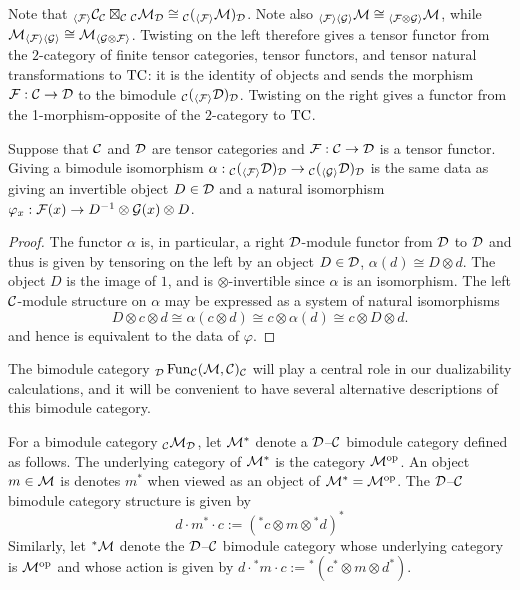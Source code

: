 \documentclass{amsart}
\begin{document}
Note that ${}_{\langle \mathcal F \rangle} \mathcal C_\mathcal C \boxtimes_{\mathcal C} {}_{\mathcal C} \mathcal M_\mathcal D \cong {}_{\mathcal C} ({}_{\langle \mathcal F \rangle} \mathcal M)_\mathcal D$.  Note also ${}_{\langle \mathcal F \rangle \langle \mathcal G \rangle} \mathcal M \cong {}_{\langle \mathcal F \otimes \mathcal G \rangle} \mathcal M$, while $\mathcal M_{\langle \mathcal F \rangle \langle \mathcal G \rangle} \cong  \mathcal M_{\langle \mathcal G \otimes \mathcal F \rangle}$.  Twisting on the left therefore gives a tensor functor from the $2$-category of finite tensor categories, tensor functors, and tensor natural transformations to $\mathrm{TC}$: it is the identity of objects and sends the morphism $\mathcal F: \mathcal C \rightarrow \mathcal D$ to the bimodule ${}_{\mathcal C} ({}_{\langle \mathcal F \rangle} \mathcal D)_{\mathcal D}$.  Twisting on the right gives a functor from the 1-morphism-opposite of the $2$-category to $\mathrm{TC}$.

\begin{lemma}
Suppose that $\mathcal C$ and $\mathcal D$ are tensor categories and $\mathcal F: \mathcal C \rightarrow \mathcal D$ is a tensor functor.
Giving a bimodule isomorphism $\alpha:{}_{\mathcal C} ({}_{\langle \mathcal F \rangle} \mathcal D)_\mathcal D \rightarrow {}_{\mathcal C} ({}_{\langle \mathcal G \rangle} \mathcal D)_\mathcal D$ is the same data as giving an invertible object $D \in \mathcal D$ and a natural isomorphism $\varphi_x: \mathcal F(x) \rightarrow D^{-1} \otimes \mathcal G(x) \otimes D$.
\end{lemma}
\begin{proof}
The functor $\alpha$ is, in particular, a right $\mathcal D$-module functor from $\mathcal D$ to $\mathcal D$ and thus is given by tensoring on the left by an object $D \in \mathcal D$, $\alpha(d) \cong D \otimes d$. The object $D$ is the image of $1$, and is $\otimes$-invertible since $\alpha$ is an isomorphism. The left $\mathcal C$-module structure on $\alpha$ may be expressed as a system of natural isomorphisms
\begin{equation*}
	D \otimes c \otimes d \cong \alpha (c \otimes d) \cong c \otimes \alpha(d) \cong c \otimes D \otimes d.
\end{equation*}
and hence is equivalent to the data of $\varphi$. 
\end{proof}

The bimodule category ${}_\mathcal D \operatorname{Fun}_\mathcal C(\mathcal M,\mathcal C)_\mathcal C$ will play a central role in our dualizability calculations, and it will be convenient to have several alternative descriptions of this bimodule category.

\begin{definition} \label{def:Dual_bimodule_notation}
For a bimodule category ${}_\mathcal C \mathcal M_\mathcal D$, let $\mathcal M^*$ denote a $\mathcal D$--$\mathcal C$ bimodule category defined as follows.  The underlying category of $\mathcal M^*$ is the category $\mathcal M^{\mathrm{op}}$. An object $m \in \mathcal M$ is denotes $m^*$ when viewed as an object of $\mathcal M^* = \mathcal M^{\mathrm{op}}$.  The $\mathcal D$--$\mathcal C$ bimodule category structure is given by
\begin{equation*}
	d\cdot m^* \cdot c := ({}^*c \otimes m \otimes {}^*d)^*
\end{equation*}
Similarly, let ${}^*\mathcal M$ denote the $\mathcal D$--$\mathcal C$ bimodule category whose underlying category is $\mathcal M^{\mathrm{op}}$ and whose action is given by $d\cdot {}^*m \cdot c := {}^*(c^* \otimes m \otimes d^*)$.  
\end{definition}
\end{document}
